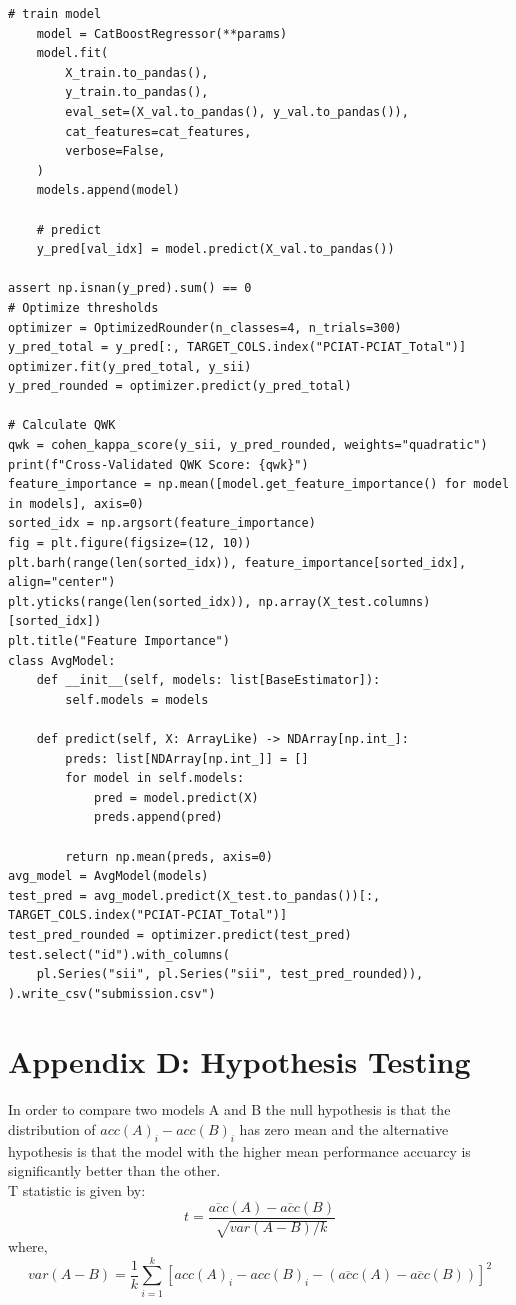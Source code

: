 \documentclass[12pt]{extarticle}
\begin{document}
\begin{mdframed}
\begin{lstlisting}[breaklines=true]
    # train model
    model = CatBoostRegressor(**params)
    model.fit(
        X_train.to_pandas(),
        y_train.to_pandas(),
        eval_set=(X_val.to_pandas(), y_val.to_pandas()),
        cat_features=cat_features,
        verbose=False,
    )
    models.append(model)

    # predict
    y_pred[val_idx] = model.predict(X_val.to_pandas())

assert np.isnan(y_pred).sum() == 0
# Optimize thresholds
optimizer = OptimizedRounder(n_classes=4, n_trials=300)
y_pred_total = y_pred[:, TARGET_COLS.index("PCIAT-PCIAT_Total")]
optimizer.fit(y_pred_total, y_sii)
y_pred_rounded = optimizer.predict(y_pred_total)

# Calculate QWK
qwk = cohen_kappa_score(y_sii, y_pred_rounded, weights="quadratic")
print(f"Cross-Validated QWK Score: {qwk}")
feature_importance = np.mean([model.get_feature_importance() for model in models], axis=0)
sorted_idx = np.argsort(feature_importance)
fig = plt.figure(figsize=(12, 10))
plt.barh(range(len(sorted_idx)), feature_importance[sorted_idx], align="center")
plt.yticks(range(len(sorted_idx)), np.array(X_test.columns)[sorted_idx])
plt.title("Feature Importance")
class AvgModel:
    def __init__(self, models: list[BaseEstimator]):
        self.models = models

    def predict(self, X: ArrayLike) -> NDArray[np.int_]:
        preds: list[NDArray[np.int_]] = []
        for model in self.models:
            pred = model.predict(X)
            preds.append(pred)

        return np.mean(preds, axis=0)
avg_model = AvgModel(models)
test_pred = avg_model.predict(X_test.to_pandas())[:, TARGET_COLS.index("PCIAT-PCIAT_Total")]
test_pred_rounded = optimizer.predict(test_pred)
test.select("id").with_columns(
    pl.Series("sii", pl.Series("sii", test_pred_rounded)),
).write_csv("submission.csv")
\end{lstlisting}
\end{mdframed}
\pagebreak
\section*{Appendix D: Hypothesis Testing}
In order to compare two models A and B the null hypothesis is that the distribution of $acc(A)_i - acc(B)_i$ has zero mean and the alternative hypothesis is that the model with the higher mean performance accuarcy is significantly better than the other.\\
T statistic is given by:
    \[
    t = \frac{\overline{acc}(A) - \overline{acc}(B)}{\sqrt{var(A - B)/k}}
    \]
    where,
    \[
    var(A - B) = \frac{1}{k}\sum_{i=1}^k [acc(A)_i - acc(B)_i - (\overline{acc}(A) - \overline{acc}(B))]^2
    \]
\end{document}
